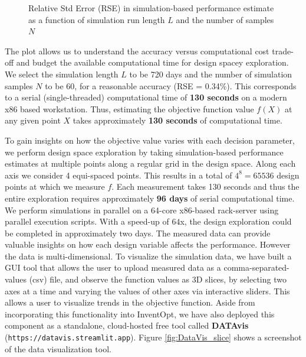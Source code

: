 \begin{figure}[!h]
  \vspace{-0.2cm}
  \centering
   {}
  \caption{Relative Std Error (RSE) in simulation-based performance estimate as a function of simulation run length $L$ and the number of samples $N$}
  \label{fig:compute_effort}  
\end{figure}

 The plot allows us to understand the accuracy versus computational cost trade-off and budget the available computational time for design spacey exploration. We select the simulation length $L$ to be 720 days and the number of simulation samples $N$ to be 60, for a reasonable accuracy (RSE = 0.34\%). This corresponds to a serial (single-threaded) computational time of \textbf{130 seconds} on a modern x86 based workstation. Thus, estimating the objective function value $f(X)$ at any given point $X$ takes approximately \textbf{130 seconds} of computational time.
 
  To gain insights on how the objective value varies with each decision parameter, we perform design space exploration by taking simulation-based performance estimates at multiple points along a regular grid in the design space. Along each axis we consider 4 equi-spaced points. This results in a total of $4^8 = 65536$ design points at which we measure $f$.  Each measurement takes 130 seconds and thus the entire exploration requires approximately \textbf{96 days} of serial computational time. We perform  simulations in parallel on a 64-core x86-based rack-server using parallel execution scripts. With a speed-up of $64$x, the design exploration could be completed in approximately two days. 
 The measured data can provide valuable insights on how each design variable affects the performance. However the data is multi-dimensional. To visualize the simulation data, we have built a GUI tool that allows the user to upload measured data as a comma-separated-values (csv) file, and observe the function values as 3D slices, by selecting two axes at a time and varying the values of other axes via interactive sliders. This allows a user to visualize trends in the objective function. Aside from incorporating this functionality into InventOpt, we have also deployed this component as a standalone, cloud-hosted free tool called \textbf{DATAvis} (\texttt{https://datavis.streamlit.app}). Figure 
 \ref{fig:DataVis_slice} shows a screenshot of the data visualization tool. 


